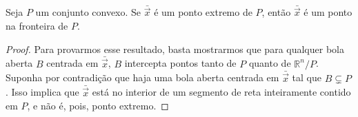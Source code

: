\begin{prop:pontos extremos na fronteira}
Seja $P$ um conjunto convexo. Se $\bar{\vec{x}}$ é um ponto extremo de $P$,
então $\bar{\vec{x}}$ é um ponto na fronteira de $P$.

  \begin{proof}
    Para provarmos esse resultado, basta mostrarmos que para qualquer bola
    aberta $B$ centrada em $\bar{\vec{x}}$, $B$ intercepta pontos tanto de
    $P$ quanto de $\mathbb{R}^n / P$. Suponha por contradição que haja uma
    bola aberta centrada em $\bar{\vec{x}}$ tal que $B \subsetneq P$. Isso
    implica que $\bar{\vec{x}}$ está no interior de um segmento de reta
    inteiramente contido em $P$, e não é, pois, ponto extremo.
  \end{proof}
\end{prop:pontos extremos na fronteira}

